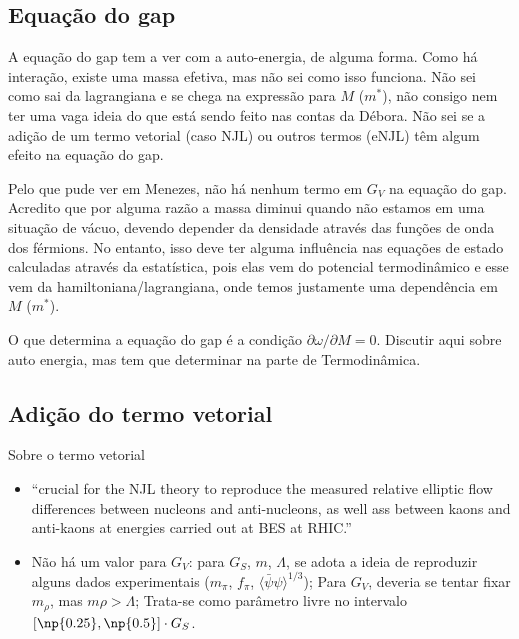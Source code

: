 \subsection{Equação do gap}

A equação do gap tem a ver com a auto-energia, de alguma forma. Como há interação, existe uma massa efetiva, mas não sei como isso funciona. Não sei como sai da lagrangiana e se chega na expressão para $M$ ($m^*$), não consigo nem ter uma vaga ideia do que está sendo feito nas contas da Débora. Não sei se a adição de um termo vetorial (caso NJL) ou outros termos (eNJL) têm algum efeito na equação do gap.

Pelo que pude ver em Menezes\cite{NJLv}, não há nenhum termo em $G_V$ na equação do gap. Acredito que por alguma razão a massa diminui quando não estamos em uma situação de vácuo, devendo depender da densidade através das funções de onda dos férmions. No entanto, isso deve ter alguma influência nas equações de estado calculadas através da estatística, pois elas vem do potencial termodinâmico e esse vem da hamiltoniana/lagrangiana, onde temos justamente uma dependência em $M$ ($m^*$).

O que determina a equação do gap é a condição $\partial \omega / \partial M = 0$. Discutir aqui sobre auto energia, mas tem que determinar na parte de Termodinâmica.

\subsection{Adição do termo vetorial}

Sobre o termo vetorial \parencite{Restrepo2015}
\begin{itemize}
	\item ``crucial for the NJL theory to reproduce the measured relative elliptic flow differences between nucleons and anti-nucleons, as well ass between kaons and anti-kaons at energies carried out at BES at RHIC.''
	\item Não há um valor para $G_V$: para $G_S$, $m$, $\Lambda$, se adota a ideia de reproduzir alguns dados experimentais ($m_\pi$, $f_\pi$, $\langle\bar\psi\psi\rangle^{1/3}$); Para $G_V$, deveria se tentar fixar $m_\rho$, mas $m\rho >\Lambda$; Trata-se como parâmetro livre no intervalo $[\np{0.25},\np{0.5}] \cdot G_S$.
\end{itemize}

